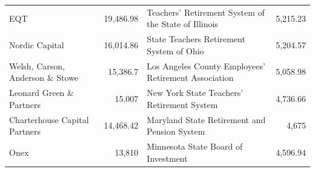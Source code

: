 \begin{table}
\begin{tabular}{l r | l r}
    EQT & 19,486.98 & Teachers' Retirement System of the State of Illinois & 5,215.23 \\
    Nordic Capital & 16,014.86 & State Teachers Retirement System of Ohio & 5,204.57 \\
    Welsh, Carson, Anderson \& Stowe & 15,386.7 & Los Angeles County Employees' Retirement Association & 5,058.98 \\
    Leonard Green \& Partners & 15,007 & New York State Teachers' Retirement System & 4,736.66 \\
    Charterhouse Capital Partners & 14,468.42 & Maryland State Retirement and Pension System & 4,675 \\
    Onex & 13,810 & Minnesota State Board of Investment & 4,596.94 \\
    \hline
    \end{tabular}
    \label{tab:selected_funds}
    \end{table}

